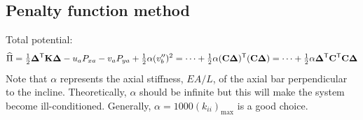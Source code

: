\begin{example}
\subsection*{Penalty function method}
Total potential:
\begin{equation*}
  \widehat\Pi = \tfrac12\bm{\Delta}^{\mathsf{T}}\mathbf{K}\bm{\Delta} - u_aP_{xa} - v_aP_{ya} + \tfrac12\alpha(v_b'')^2 = \dots + \tfrac12\alpha(\mathbf{C}\bm{\Delta})^{\mathsf{T}}(\mathbf{C}\bm{\Delta}) = \dots + \tfrac12\alpha\bm{\Delta}^{\mathsf{T}}\mathbf{C}^{\mathsf{T}}\mathbf{C}\bm{\Delta}
\end{equation*}
Note that $\alpha$ represents the axial stiffness, $EA/L$, of the axial bar perpendicular to the incline. Theoretically, $\alpha$ should be infinite but this will make the system become ill-conditioned. Generally, $\alpha = 1000(k_{ii})_{\max}$ is a good choice.


\end{example}
